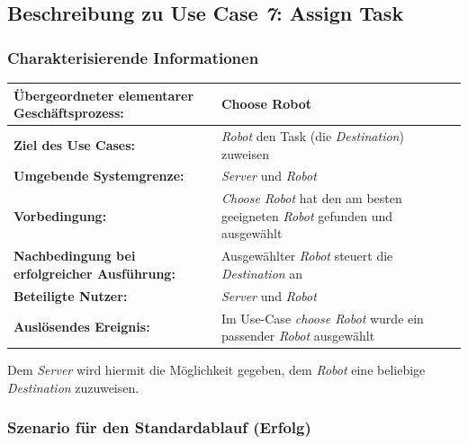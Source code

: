 			
		\pagebreak

		\subsection{Beschreibung zu Use Case \emph{7}: Assign Task}

			\subsubsection*{Charakterisierende Informationen}

			\begin{table}[H]
				\centering
				\begin{tabularx}{\textwidth}{|p{5cm}|X|}
				\hline
				\textbf{Übergeordneter elementarer Geschäftsprozess:} & Choose Robot  \\ \hline
				\textbf{Ziel des Use Cases:} & \emph{Robot} den Task (die \emph{Destination}) zuweisen\\ \hline
				\textbf{Umgebende Systemgrenze:} & \emph{Server} und \emph{Robot} \\ \hline
				\textbf{Vorbedingung:} & \textit{ \glqq Choose Robot \grqq } hat den am besten geeigneten \emph{Robot} gefunden und ausgewählt\\ \hline
				\textbf{Nachbedingung bei erfolgreicher Ausführung:} & Ausgewählter \emph{Robot} steuert die \emph{Destination} an\\ \hline
				\textbf{Beteiligte Nutzer:} & \emph{Server} und \emph{Robot}\\ \hline
				\textbf{Auslösendes Ereignis:} & Im Use-Case \textit{ \glqq choose Robot \grqq } wurde ein passender \emph{Robot} ausgewählt\\
				\hline
				\end{tabularx}
			\end{table}
			
			Dem \emph{Server} wird hiermit die Möglichkeit gegeben, dem \emph{Robot} eine beliebige \emph{Destination} zuzuweisen. 

			\subsubsection*{Szenario für den Standardablauf (Erfolg)}

